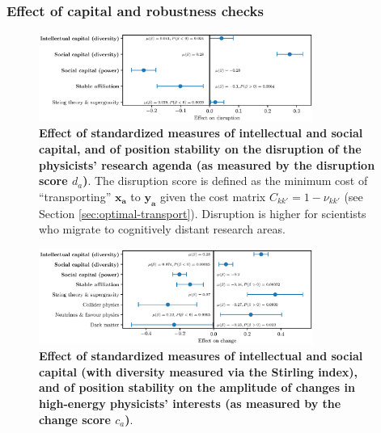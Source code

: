 \documentclass{article}
\begin{document}
\subsubsection{\label{appendix:robustness}Effect of capital and robustness checks}


\begin{figure}[H]
    \centering
    \includegraphics[width=0.8\textwidth]{plots/disruption_score_effects_entropy_magnitude.eps}
    \caption{\textbf{Effect of standardized measures of intellectual and social capital, and of position stability on the disruption of the physicists' research agenda (as measured by the disruption score $d_a$)}. The disruption score is defined as the minimum cost of ``transporting'' $\bm{x_a}$ to $\bm{y_a}$ given the cost matrix $C_{kk'}=1-\nu_{kk'}$ (see Section \ref{sec:optimal-transport}). Disruption is higher for scientists who migrate to cognitively distant research areas.}
    \label{fig:disruption_score_effect}
\end{figure}


\begin{figure}[H]
    \centering
    \includegraphics[width=0.8\textwidth]{plots/change_score_effects_stirling_magnitude.eps}
    \caption{\textbf{Effect of standardized measures of intellectual and social capital (with diversity measured via the Stirling index), and of position stability on the amplitude of changes in high-energy physicists' interests (as measured by the change score $c_a$)}. }
    \label{fig:change_score_effect_stirling}
\end{figure}
\end{document}
